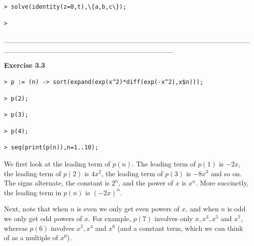 \documentclass{article}
\begin{document}
\begin{lstlisting}
> solve(identity(z=0,t),\{a,b,c\});
\end{lstlisting}
\begin{lstlisting}
> 
\end{lstlisting}
\begin{Maple Normal}
\_\_\_\_\_\_\_\_\_\_\_\_\_\_\_\_\_\_\_\_\_\_\_\_\_\_\_\_\_\_\_\_\_\_\_\_\_\_\_\_\_\_\_\_\_\_\_\_\_\_\_\_\_\_\_\_\_\_\_\_\_\_\_\_\_\_\_\_\_\_\_\_\_\_\_\_\_\_\_\_\_
\end{Maple Normal}
\begin{Maple Heading 2}
\textbf{Exercise 3.3}
\end{Maple Heading 2}
\begin{lstlisting}
> p := (n) -> sort(expand(exp(x^2)*diff(exp(-x^2),x$n)));
\end{lstlisting}
\begin{lstlisting}
> p(2);
\end{lstlisting}
\begin{lstlisting}
> p(3);
\end{lstlisting}
\begin{lstlisting}
> p(4);
\end{lstlisting}
\begin{lstlisting}
> seq(print(p(n)),n=1..10);
\end{lstlisting}
\begin{Maple Normal}
We first look at the leading term of  
$p (n)$.  The leading term of 
$p (1)$ is 
$-2 x$, the leading term of 
$p (2)$ is 
$4 x^{2}$, the leading term of 
$p (3)$ is 
$-8 x^{3}$ and so on.  The signs alternate, the constant is 
$2^{n}$, and the power of 
$x$ is 
$x^{n}$.  More succinctly, the leading term in 
$p (n)$ is 
$(-2 x)^{n}$.
\end{Maple Normal}
\begin{Maple Normal}

\end{Maple Normal}
\begin{Maple Normal}
Next, note that when 
$n$ is even we only get even powers of 
$x$, and when 
$n$ is odd we only get odd powers of 
$x$.  For example, 
$p (7)$ involves only 
$x ,x^{3},x^{5}$ and 
$x^{7}$, whereas 
$p (6)$ involves 
$x^{2},x^{4}$ and 
$x^{6}$ (and a constant term, which we can think of as a multiple of 
$x^{0}$).
\end{Maple Normal}
\begin{Maple Normal}

\end{Maple Normal}
\end{document}
